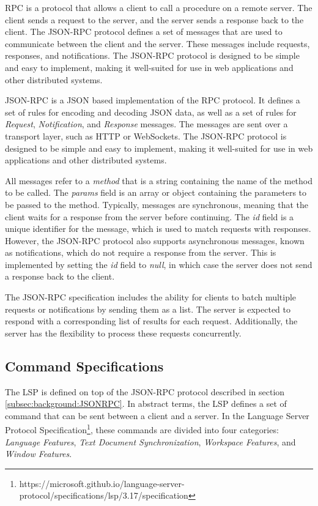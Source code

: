 RPC is a protocol that allows a client to call a procedure on a remote server. The client sends a request to the server, and the server sends a response back to the client. The JSON-RPC protocol defines a set of messages that are used to communicate between the client and the server. These messages include requests, responses, and notifications. The JSON-RPC protocol is designed to be simple and easy to implement, making it well-suited for use in web applications and other distributed systems.

JSON-RPC is a JSON based implementation of the RPC protocol. It defines a set of rules for encoding and decoding JSON data, as well as a set of rules for \textit{Request}, \textit{Notification}, and \textit{Response} messages. The messages are sent over a transport layer, such as HTTP or WebSockets. The JSON-RPC protocol is designed to be simple and easy to implement, making it well-suited for use in web applications and other distributed systems.

All messages refer to a \textit{method} that is a string containing the name of the method to be called. The \textit{params} field is an array or object containing the parameters to be passed to the method. Typically, messages are synchronous, meaning that the client waits for a response from the server before continuing. The \textit{id} field is a unique identifier for the message, which is used to match requests with responses. However, the JSON-RPC protocol also supports asynchronous messages, known as notifications, which do not require a response from the server. This is implemented by setting the \textit{id} field to \textit{null}, in which case the server does not send a response back to the client.

The JSON-RPC specification includes the ability for clients to batch multiple requests or notifications by sending them as a list. The server is expected to respond with a corresponding list of results for each request. Additionally, the server has the flexibility to process these requests concurrently.

\subsection{Command Specifications}\label{subsec:background:CommandSpecifications}
The LSP is defined on top of the JSON-RPC protocol described in section \ref{subsec:background:JSONRPC}. In abstract terms, the LSP defines a set of command that can be sent between a client and a server. In the Language Server Protocol Specification\footnote{https://microsoft.github.io/language-server-protocol/specifications/lsp/3.17/specification}, these commands are divided into four categories: \textit{Language Features}, \textit{Text Document Synchronization}, \textit{Workspace Features}, and \textit{Window Features}.


